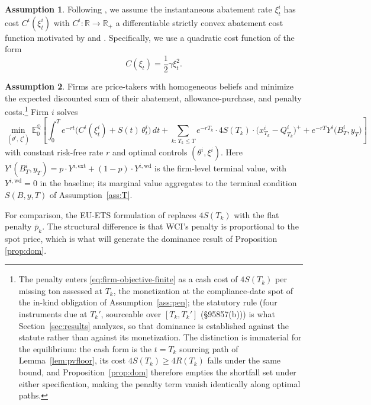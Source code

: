 \documentclass[11pt,letterpaper]{article}
\theoremstyle{plain}
\theoremstyle{definition}
\newtheorem{assumption}{Assumption}
\newcommand{\E}{\mathbb{E}}                  %
\newcommand{\Qmeasure}{\mathbb{Q}}           %
\newcommand{\R}{\mathbb{R}}
\numberwithin{equation}{section}
\begin{document}
\begin{assumption}\label{ass:abatementcosts}
Following \citet{hitzemann2018}, we assume the instantaneous abatement rate $\xi_t^i$ has cost $C^i(\xi_t^i)$ with $C^i : \R \to \R_{+}$ a differentiable strictly convex abatement cost function motivated by \citet{klepper2006} and \citet{naucler2009}. Specifically, we use a quadratic cost function of the form
\begin{equation}
 C(\xi_t)=\frac{1}{2}\gamma\xi_t^2.
\end{equation}
\end{assumption}

\begin{assumption}\label{ass:opt}
Firms are price-takers with homogeneous beliefs and minimize the expected discounted sum of their abatement, allowance-purchase, and penalty costs.\footnote{The penalty enters \eqref{eq:firm-objective-finite} as a cash cost of $4S(T_k)$ per missing ton assessed at $T_k$, the monetization at the compliance-date spot of the in-kind obligation of Assumption~\ref{ass:pen}; the statutory rule (four instruments due at $T_k'$, sourceable over $[T_k,T_k']$ (\S95857(b))) is what Section~\ref{sec:results} analyzes, so that dominance is established against the statute rather than against its monetization. The distinction is immaterial for the equilibrium: the cash form is the $t=T_k$ sourcing path of Lemma~\ref{lem:pvfloor}, its cost $4S(T_k)\ge4R(T_k)$ falls under the same bound, and Proposition~\ref{prop:dom} therefore empties the shortfall set under either specification, making the penalty term vanish identically along optimal paths.} Firm $i$ solves
\begin{equation}\label{eq:firm-objective-finite}
  \min_{(\theta^i,\,\xi^i)} \E_0^{\Qmeasure}\!\left[
    \int_0^{T} e^{-rt}\bigl(C^i(\xi_t^i) + S(t)\,\theta_t^i\bigr)\,dt
    + \sum_{k:\,T_k \le T} e^{-rT_k}\cdot 4S(T_k)\cdot
      \bigl(x_{T_k}^i - Q_{T_k}^i\bigr)^{+}
    + e^{-rT} Y^i\bigl(B_T^i, y_T\bigr)
  \right]
\end{equation}
with constant risk-free rate $r$ and optimal controls $(\theta^i,\xi^i)$. Here $Y^i(B_T^i,y_T)=p\cdot Y^{i,\mathrm{ext}}+(1-p)\cdot Y^{i,\mathrm{wd}}$ is the firm-level terminal value, with $Y^{i,\mathrm{wd}}=0$ in the baseline; its marginal value aggregates to the terminal condition $S(B,y,T)$ of Assumption~\ref{ass:T}.

For comparison, the EU-ETS formulation of \citet{hitzemann2018} replaces $4S(T_k)$ with the flat penalty $\bar p_k$. The structural difference is that WCI's penalty is proportional to the spot price, which is what will generate the dominance result of Proposition \ref{prop:dom}.
\end{assumption}
\end{document}
